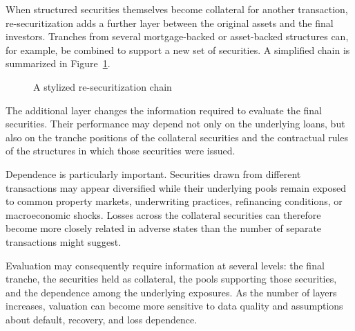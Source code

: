 When structured securities themselves become collateral for another transaction, re-securitization adds a further layer between the original assets and the final investors. Tranches from several mortgage-backed or asset-backed structures can, for example, be combined to support a new set of securities. A simplified chain is
summarized in Figure~\ref{fig:ch20-resecuritization-chain}.
\begin{figure}[htbp]
\centering


\caption{A stylized re-securitization chain}
\label{fig:ch20-resecuritization-chain}

\end{figure}

The additional layer changes the information required to evaluate the final securities. Their performance may depend not only on the underlying loans, but also on the tranche positions of the collateral securities and the contractual rules of the structures in which those securities were issued.

Dependence is particularly important. Securities drawn from different transactions may appear diversified while their underlying pools remain exposed to common property markets, underwriting practices, refinancing conditions, or macroeconomic shocks. Losses across the collateral securities can therefore become more closely related in adverse states than the number of separate transactions might suggest.

Evaluation may consequently require information at several levels: the final tranche, the securities held as collateral, the pools supporting those securities, and the dependence among the underlying exposures. As the number of layers increases, valuation can become more sensitive to data quality and assumptions about default, recovery, and loss dependence.

